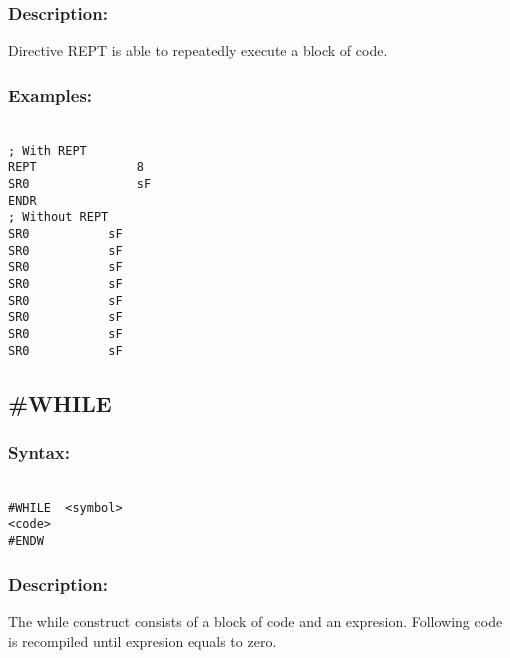         \subsubsection{Description:}
            Directive REPT is able to repeatedly execute a block of code.

        \subsubsection{Examples:}
        {
            ~\\
            \usecodefont
                \verb'; With REPT'\\
                \verb'REPT              8'\\
                \verb'SR0               sF'\\
                \verb'ENDR'\\
                \verb'; Without REPT'\\
                \verb'SR0           sF'\\
                \verb'SR0           sF'\\
                \verb'SR0           sF'\\
                \verb'SR0           sF'\\
                \verb'SR0           sF'\\
                \verb'SR0           sF'\\
                \verb'SR0           sF'\\
                \verb'SR0           sF'\\
        }

    \subsection{\#WHILE}
        \subsubsection{Syntax:}
        {
            ~\\
            \usecodefont        
            \verb'#WHILE  <symbol>'\\
            \verb'<code>'\\
            \verb'#ENDW'
        }
        
        \subsubsection{Description:}
        The while construct consists of a block of code and an expresion. Following code is recompiled until expresion equals to zero.

